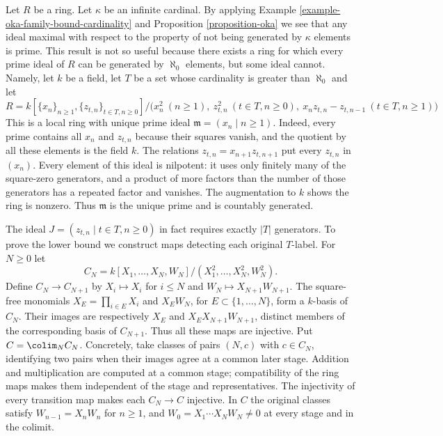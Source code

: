 \begin{remark}
\label{remark-cohen-bound-cardinality}
Let $R$ be a ring. Let $\kappa$ be an infinite cardinal.
By applying
Example \ref{example-oka-family-bound-cardinality} and
Proposition \ref{proposition-oka}
we see that any ideal maximal with respect to the property of not being
generated by $\kappa$ elements is prime. This result is not so
useful because there exists a ring for which every prime ideal
of $R$ can be generated by $\aleph_0$ elements, but some
ideal cannot. Namely, let $k$ be a field, let $T$ be a set whose
cardinality is greater than $\aleph_0$ and let
$$
R = k[\{x_n\}_{n \geq 1}, \{z_{t, n}\}_{t \in T, n \geq 0}]/
\bigl(x_n^2\ (n\geq1),\ z_{t,n}^2\ (t\in T,n\geq0),\
x_nz_{t,n}-z_{t,n-1}\ (t\in T,n\geq1)\bigr)
$$
This is a local ring with unique prime ideal
$\mathfrak m=(x_n\mid n\geq1)$. Indeed, every prime contains all
$x_n$ and $z_{t,n}$ because their squares vanish, and the quotient
by all these elements is the field $k$. The relations
$z_{t,n}=x_{n+1}z_{t,n+1}$ put every $z_{t,n}$ in $(x_n)$.
Every element of this ideal is nilpotent: it uses only finitely many
of the square-zero generators, and a product of more factors than
the number of those generators has a repeated factor and vanishes.
The augmentation to $k$ shows the ring is nonzero.
Thus $\mathfrak m$ is the unique prime and is countably generated.

\medskip\noindent
The ideal $J=(z_{t,n}\mid t\in T,n\geq0)$ in fact requires exactly
$|T|$ generators. To prove the lower bound we construct maps detecting
each original $T$-label. For $N\geq0$ let
$$
C_N=k[X_1,\ldots,X_N,W_N]/(X_1^2,\ldots,X_N^2,W_N^2).
$$
Define $C_N\to C_{N+1}$ by $X_i\mapsto X_i$ for $i\leq N$
and $W_N\mapsto X_{N+1}W_{N+1}$.
The square-free monomials
$X_E=\prod_{i\in E}X_i$ and $X_EW_N$, for $E\subset\{1,\ldots,N\}$,
form a $k$-basis of $C_N$.
Their images are respectively $X_E$ and $X_EX_{N+1}W_{N+1}$,
distinct members of the corresponding basis of $C_{N+1}$.
Thus all these maps are injective. Put $C=\colim_N C_N$.
Concretely, take classes of pairs $(N,c)$ with $c\in C_N$, identifying
two pairs when their images agree at a common later stage. Addition
and multiplication are computed at a common stage; compatibility of
the ring maps makes them independent of the stage and representatives.
The injectivity of every transition map makes each $C_N\to C$ injective.
In $C$ the original classes satisfy
$W_{n-1}=X_nW_n$ for $n\geq1$, and
$W_0=X_1\cdots X_NW_N\ne0$ at every stage and in the colimit.


\end{remark}
